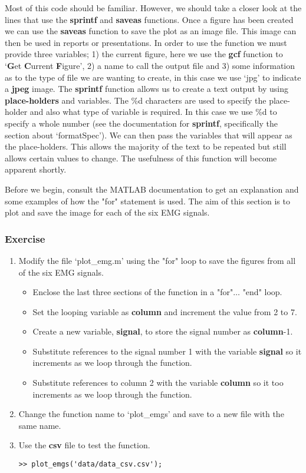 \documentclass[12pt,a4paper]{article}
\begin{document}
Most of this code should be familiar.  
However, we should take a closer look at the lines that use the \textbf{sprintf} and \textbf{saveas} functions.  
Once a figure has been created we can use the \textbf{saveas} function to save the plot as an image file.  
This image can then be used in reports or presentations.  
In order to use the function we must provide three variables; 1) the current figure, here we use the \textbf{gcf} function to `\textbf{G}et \textbf{C}urrent \textbf{F}igure', 2) a name to call the output file and 3) some information as to the type of file we are wanting to create, in this case we use `jpg' to indicate a \textbf{jpeg} image.  
The \textbf{sprintf} function allows us to create a text output by using \textbf{place-holders} and variables.  
The \%d characters are used to specify the place-holder and also what type of variable is required.  
In this case we use \%d to specify a whole number (see the documentation for \textbf{sprintf}, specifically the section about `formatSpec').  
We can then pass the variables that will appear as the place-holders.  
This allows the majority of the text to be repeated but still allows certain values to change.  
The usefulness of this function will become apparent shortly.

Before we begin, consult the MATLAB documentation to get an explanation and some examples of how the "for" statement is used.  
The aim of this section is to plot and save the image for each of the six EMG signals.

\subsubsection*{Exercise}
\begin{enumerate}
	\item Modify the file `plot\_emg.m' using the "for" loop to save the figures from all of the six EMG signals.
	\begin{itemize}
		\item Enclose the last three sections of the function in a "for"$\dots$ "end" loop.
		\item Set the looping variable as \textbf{column} and increment the value from 2 to 7.
		\item Create a new variable, \textbf{signal}, to store the signal number as \textbf{column}-1.
		\item Substitute references to the signal number 1 with the variable \textbf{signal} so it increments as we loop through the function.
		\item Substitute references to column 2 with the variable \textbf{column} so it too increments as we loop through the function.
	\end{itemize}
	\item Change the function name to `plot\_emgs' and save to a new file with the same name.
	\item Use the \textbf{csv} file to test the function.
	\begin{lstlisting}[style=Matlab-editor]
>> plot_emgs('data/data_csv.csv');

	\end{lstlisting}	
\end{enumerate}
\end{document}
